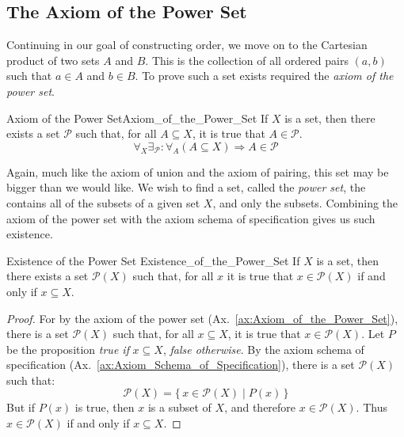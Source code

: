     \subsection{The Axiom of the Power Set}
        Continuing in our goal of constructing order, we move on to the
        Cartesian product of two sets $A$ and $B$. This is the collection of
        all ordered pairs $(a,b)$ such that $a\in{A}$ and $b\in{B}$. To prove
        such a set exists required the \textit{axiom of the power set}.
        \begin{faxiom}{Axiom of the Power Set}{Axiom_of_the_Power_Set}
            If $X$ is a set, then there exists a set $\mathscr{P}$ such that,
            for all $A\subseteq{X}$, it is true that $A\in\mathscr{P}$.
            \begin{equation*}
                \forall_{X}\exists_{\mathscr{P}}:
                \forall_{A}(A\subseteq{X})\Rightarrow{A}\in\mathscr{P}
            \end{equation*}
        \end{faxiom}
        Again, much like the axiom of union and the axiom of pairing, this
        set may be bigger than we would like. We wish to find a set, called
        the \textit{power set}, the contains all of the subsets of a given
        set $X$, and only the subsets. Combining the axiom of the power set
        with the axiom schema of specification gives us such existence.
        \begin{ltheorem}{Existence of the Power Set}
                        {Existence_of_the_Power_Set}
            If $X$ is a set, then there exists a set $\mathcal{P}(X)$
            such that, for all $x$ it is true that $x\in\mathcal{P}(X)$ if and
            only if $x\subseteq{X}$.
        \end{ltheorem}
        \begin{proof}
            For by the axiom of the power set
            (Ax.~\ref{ax:Axiom_of_the_Power_Set}), there is a set
            $\mathscr{P}(X)$ such that, for all $x\subseteq{X}$, it is true
            that $x\in\mathscr{P}(X)$. Let $P$ be the proposition
            \textit{true if} $x\subseteq{X}$, \textit{false otherwise}. By the
            axiom schema of specification
            (Ax.~\ref{ax:Axiom_Schema_of_Specification}), there is a set
            $\mathcal{P}(X)$ such that:
            \begin{equation}
                \mathcal{P}(X)=\{\,x\in\mathscr{P}(X)\;|\;P(x)\,\}
            \end{equation}
            But if $P(x)$ is true, then $x$ is a subset of $X$, and therefore
            $x\in\mathscr{P}(X)$. Thus $x\in\mathcal{P}(X)$ if and only if
            $x\subseteq{X}$.
        \end{proof}
